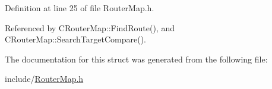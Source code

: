 Definition at line 25 of file Router\+Map.\+h.



Referenced by C\+Router\+Map\+::\+Find\+Route(), and C\+Router\+Map\+::\+Search\+Target\+Compare().



The documentation for this struct was generated from the following file\+:\begin{DoxyCompactItemize}
\item 
include/\hyperlink{RouterMap_8h}{Router\+Map.\+h}\end{DoxyCompactItemize}
